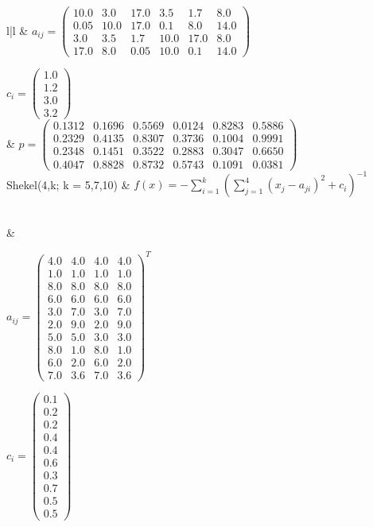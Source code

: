 \documentclass[fontsize=12, a4aper]{scrartcl}
\newcommand\Tstrut{\rule{0pt}{3ex}}           %
\begin{document}
\begin{table}[H]
\begin{tabularx}{\textwidth}{l|l}
			& \(a_{ij} = \begin{pmatrix}
				10.0 & 3.0 & 17.0 & 3.5 & 1.7 & 8.0\\
				0.05 & 10.0 & 17.0 & 0.1 & 8.0 & 14.0\\
				3.0 & 3.5 & 1.7 & 10.0 & 17.0 & 8.0\\
				17.0 & 8.0 & 0.05 & 10.0 & 0.1 & 14.0
			\end{pmatrix}\)
			
			\(c_i =	\begin{pmatrix}
				1.0\\
				1.2\\
				3.0\\
				3.2
			\end{pmatrix}\)\\
			
			& \(p = 	\begin{pmatrix}
				0.1312 & 0.1696 & 0.5569 & 0.0124 & 0.8283 & 0.5886\\
				0.2329 & 0.4135 & 0.8307 & 0.3736 & 0.1004 & 0.9991\\
				0.2348 & 0.1451 & 0.3522 & 0.2883 & 0.3047 & 0.6650\\
				0.4047 & 0.8828 & 0.8732 & 0.5743 & 0.1091 & 0.0381
			\end{pmatrix}\)\\
			
			Shekel(4,k; k = 5,7,10) & \(f(x) = -\sum_{i=1}^{k}(\sum_{j=1}^{4} (x_j - a_{ji})^2 + c_i)^{-1}\)\Tstrut\\
			&
			
			\(a_{ij} = \begin{pmatrix}
				4.0 & 4.0 & 4.0 & 4.0\\
				1.0 & 1.0 & 1.0 & 1.0\\
				8.0 & 8.0 & 8.0 & 8.0\\
				6.0 & 6.0 & 6.0 & 6.0\\
				3.0 & 7.0 & 3.0 & 7.0\\
				2.0 & 9.0 & 2.0 & 9.0\\
				5.0 & 5.0 & 3.0 & 3.0\\
				8.0 & 1.0 & 8.0 & 1.0\\
				6.0 & 2.0 & 6.0 & 2.0\\
				7.0 & 3.6 & 7.0 & 3.6
			\end{pmatrix}^T\)
			
			\(c_i =	\begin{pmatrix}
				0.1\\
				0.2\\
				0.2\\
				0.4\\
				0.4\\
				0.6\\
				0.3\\
				0.7\\
				0.5\\
				0.5
			\end{pmatrix}\)
			
		\end{tabularx}
		
	\end{table}
	
\end{document}

